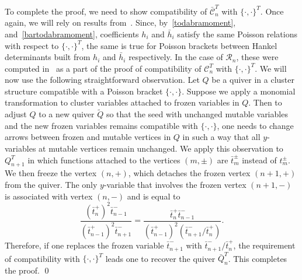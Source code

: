 \documentclass{amsart}
\theoremstyle{definition}
\theoremstyle{remark}
\numberwithin{equation}{section}
\numberwithin{theorem}{section}
\def\CC{{\mathcal C}}
\def\RR{{\mathcal R}}
\def\Poi{{\{{\cdot},{\cdot}\}}}
\begin{document}
To complete the proof, we need to show compatibility of $\bar\CC_n^T$ with $\Poi^T$. Once again, we will rely on results from~\cite{GSV_Acta}. Since, by~\eqref{todabramoment}, and~\eqref{bartodabramoment}, coefficients $h_i$ and $\bar h_i$ satisfy the same Poisson relations with respect to $\Poi^T$, the same is true for Poisson brackets between Hankel determinants built from $h_i$ and $\bar h_i$ respectively. In the case of $\RR_n$, these were computed in~\cite{GSV_Acta} as a part of the proof of compatibility of $\CC_n^T$ with $\Poi^T$. 
We will now use the following straightforward observation.
Let $Q$ be a quiver in a cluster structure compatible with a Poisson bracket $\Poi$. Suppose we apply a monomial transformation to cluster variables attached to frozen variables in $Q$. Then to adjust $Q$ to a new quiver $\tilde Q$ so that the seed with unchanged mutable variables and the new frozen variables remains compatible with $\Poi$, one needs to change arrows between frozen and mutable vertices in $Q$ in such a way that all $y$-variables at mutable vertices remain unchanged. We apply this observation to $Q^T_{n+1}$ in which functions attached to the vertices $(m,\pm)$ are $\bar t_m^\pm$
instead of $t_m^\pm$.
We then freeze the vertex $(n,+)$, which detaches the frozen vertex $(n+1,+)$ from the quiver.  The only $y$-variable that involves the frozen vertex $(n+1,-)$
is associated with vertex $(n,-)$ and is equal to
\[ \frac{(\bar t_n^+)^2 \bar t^-_{n-1}}{(\bar t_{n-1}^+)^2 \bar t^-_{n+1}}
=  \frac{\bar t_n^+\bar t^-_{n-1}}{(\bar t_{n-1}^+)^2 (\bar t^-_{n+1}/\bar t_n^+)}.
\] 
Therefore, if one  replaces the frozen variable $\bar t_{n+1}^-$ with $\bar t_{n+1}^-/\bar t_{n}^+$, the requirement of compatibility with $\Poi^T$ leads one to recover the quiver $\bar Q^T_n$. This completes the proof. \qed
\end{document}

